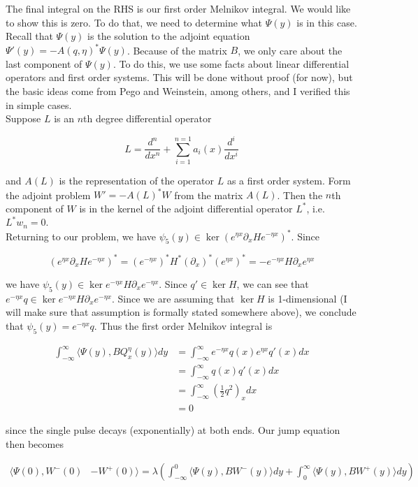 \documentclass[12pt]{article}
\begin{document}
The final integral on the RHS is our first order Melnikov integral. We would like to show this is zero. To do that, we need to determine what $\Psi(y)$ is in this case. Recall that $\Psi(y)$ is the solution to the adjoint equation $\Psi'(y) = -A(q, \eta)^*\Psi(y)$. Because of the matrix $B$, we only care about the last component of $\Psi(y)$. To do this, we use some facts about linear differential operators and first order systems. This will be done without proof (for now), but the basic ideas come from Pego and Weinstein, among others, and I verified this in simple cases.\\

Suppose $L$ is an $n$th degree differential operator

\[
L = \frac{d^n}{dx^n} + \sum_{i = 1}^{n=1}a_i(x) \frac{d^i}{dx^i}
\]

and $A(L)$ is the representation of the operator $L$ as a first order system. Form the adjoint problem $W' = -A(L)^* W$ from the matrix $A(L)$. Then the $n$th component of $W$ is in the kernel of the adjoint differential operator $L^*$, i.e. $L^* w_n = 0$.\\

Returning to our problem, we have $\psi_5(y) \in \ker (e^{\eta x} \partial_x H e^{-\eta x})^*$. Since

\[
(e^{\eta x} \partial_x H e^{-\eta x})^* = (e^{-\eta x})^* H^* (\partial_x)^* (e^{\eta x})^* = -e^{-\eta x} H \partial_x e^{\eta x}
\]

we have $\psi_5(y) \in \ker e^{-\eta x} H \partial_x e^{-\eta x}$. Since $q' \in \ker H$, we can see that $e^{-\eta x} q \in \ker e^{-\eta x} H \partial_x e^{-\eta x}$. Since we are assuming that $\ker H$ is 1-dimensional (I will make sure that assumption is formally stated somewhere above), we conclude that $\psi_5(y) = e^{-\eta x} q$. Thus the first order Melnikov integral is

\begin{align*}
\int_{-\infty}^\infty \langle\Psi(y), BQ^\eta_x(y) \rangle dy &= \int_{-\infty}^\infty e^{-\eta x} q(x) e^{\eta x} q'(x) dx\\
&= \int_{-\infty}^\infty  q(x) q'(x) dx \\
&= \int_{-\infty}^\infty \left( \frac{1}{2} q^2 \right)_x dx\\
&= 0
\end{align*}

since the single pulse decays (exponentially) at both ends. Our jump equation then becomes

\begin{align*}
\langle\Psi(0), W^-(0) &- W^+(0)\rangle = \lambda\left( \int_{-\infty}^0 \langle \Psi(y), B W^-(y) \rangle dy + \int_0^\infty \langle \Psi(y), B W^+(y) \rangle dy \right)
\end{align*}
\end{document}
